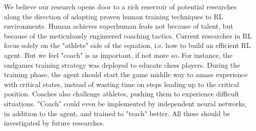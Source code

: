 \documentclass[journal]{IEEEtran}
\begin{document}
We believe our research opens door to a rich reservoir of potential researches along the direction of adapting proven human training techniques to RL environments. Human achieves superhuman feats not because of talent, but because of the meticulously engineered coaching tactics. Current researches in RL focus solely on the "athlete" side of the equation, i.e. how to build an efficient RL agent. But we feel "coach" is as important, if not more so.  For instance, the endgames training strategy was deployed to educate chess players. During the training phase, the agent should start the game middle way to amass experience with critical states, instead of wasting time on steps leading up to the critical position. Coaches also challenge athletes, pushing them to experience difficult situations. "Coach" could even be implemented by independent neural networks, in addition to the agent, and trained to "teach" better. All these should be investigated by future researches. 



\end{document}
